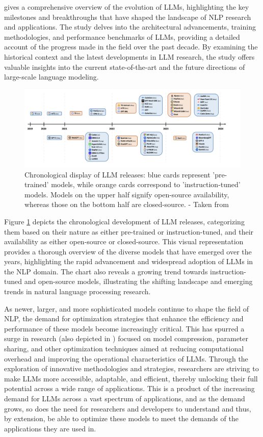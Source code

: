\cite{naveed2024comprehensive} gives a comprehensive overview of the evolution of LLMs, highlighting the key milestones and breakthroughs that have shaped the landscape of NLP research and applications. The study delves into the architectural advancements, training methodologies, and performance benchmarks of LLMs, providing a detailed account of the progress made in the field over the past decade. By examining the historical context and the latest developments in LLM research, the study offers valuable insights into the current state-of-the-art and the future directions of large-scale language modeling.
\begin{figure}[H]
    \centering
    \includegraphics[width=\textwidth]{figs/Chronological_Display.png}
    \caption{Chronological display of LLM releases:  blue cards represent 'pre-trained' models, while orange cards correspond to 'instruction-tuned' models. Models on the upper half signify open-source availability, whereas those on the bottom half are closed-source. - Taken from \cite{naveed2024comprehensive}}
    \label{fig:llm_evolution}
\end{figure}
Figure \ref{fig:llm_evolution} depicts the chronological development of LLM releases, categorizing them based on their nature as either pre-trained or instruction-tuned, and their availability as either open-source or closed-source. This visual representation provides a thorough overview of the diverse models that have emerged over the years, highlighting the rapid advancement and widespread adoption of LLMs in the NLP domain. The chart also reveals a growing trend towards instruction-tuned and open-source models, illustrating the shifting landscape and emerging trends in natural language processing research.

As newer, larger, and more sophisticated models continue to shape the field of NLP, the demand for optimization strategies that enhance the efficiency and performance of these models become increasingly critical. This has spurred a surge in research (also depicted in \cite{naveed2024comprehensive}) focused on model compression, parameter sharing, and other optimization techniques aimed at reducing computational overhead and improving the operational characteristics of LLMs. Through the exploration of innovative methodologies and strategies, researchers are striving to make LLMs more accessible, adaptable, and efficient, thereby unlocking their full potential across a wide range of applications.
This is a product of the increasing demand for LLMs across a vast spectrum of applications, and as the demand grows, so does the need for researchers and developers to understand and thus, by extension, be able to optimize these models to meet the demands of the applications they are used in.

